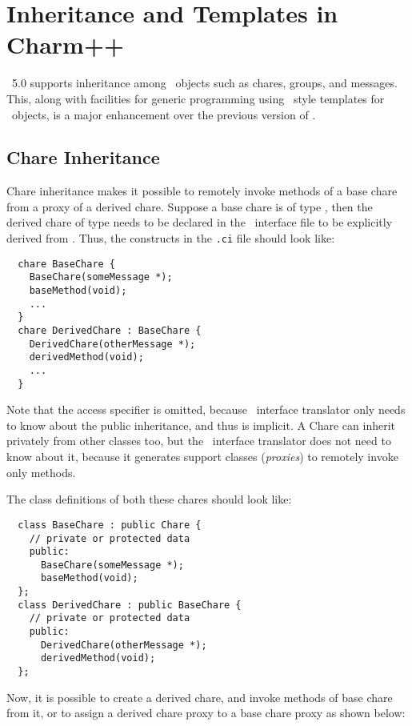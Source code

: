 \section{Inheritance and Templates in Charm++}
\label{inheritance and templates}

\charmpp\ 5.0 supports inheritance among \charmpp\ objects such as
chares, groups, and messages. This, along with facilities for generic
programming using \CC\ style templates for \charmpp\ objects, is a
major enhancement over the previous version of \charmpp.

\subsection{Chare Inheritance}
Chare inheritance makes it possible to remotely invoke methods of a base
chare  from a proxy of a derived
chare. Suppose a base chare is of type 
, then the derived chare of type  needs to be
declared in the \charmpp\ interface file to be explicitly derived from
. Thus, the constructs in the {\tt .ci} file should look like:

\begin{verbatim}
  chare BaseChare {
    BaseChare(someMessage *);
    baseMethod(void);
    ...
  }
  chare DerivedChare : BaseChare {
    DerivedChare(otherMessage *);
    derivedMethod(void);
    ...
  }
\end{verbatim}

Note that the access specifier  is omitted, because \charmpp\
interface translator only needs to know about the public inheritance,
and thus \kw{public} is implicit. A Chare can inherit privately from other
classes too, but the \charmpp\ interface translator does not need to know
about it, because it generates support classes ({\em proxies}) to remotely
invoke only \kw{public} methods.

The class definitions of both these chares should look like:

\begin{verbatim}
  class BaseChare : public Chare {
    // private or protected data
    public:
      BaseChare(someMessage *);
      baseMethod(void);
  };
  class DerivedChare : public BaseChare {
    // private or protected data
    public:
      DerivedChare(otherMessage *);
      derivedMethod(void);
  };
\end{verbatim}

Now, it is possible to create a derived chare, and invoke methods of base
chare from it, or to assign a derived chare proxy to a base chare proxy
as shown below:

